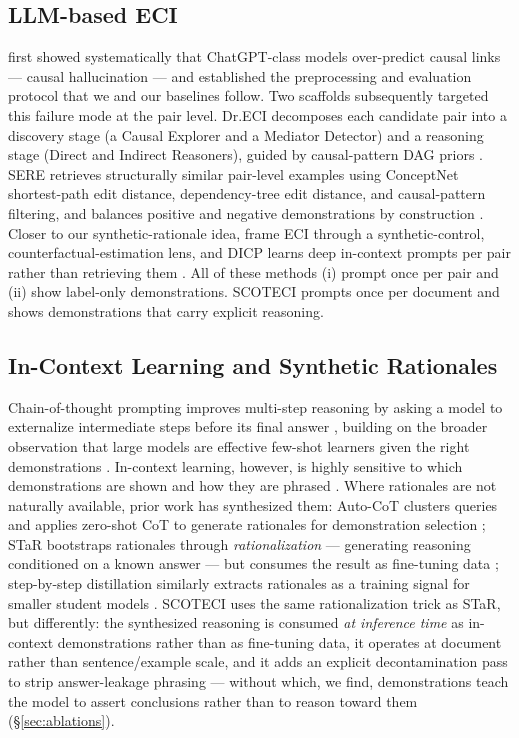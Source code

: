 \documentclass[11pt]{article}
\newcommand{\method}{SCOTECI}
\begin{document}
\subsection{LLM-based ECI}
\citet{gao2023chatgpt} first showed systematically that ChatGPT-class models
over-predict causal links --- causal hallucination --- and established the
preprocessing and evaluation protocol that we and our baselines follow. Two
scaffolds subsequently targeted this failure mode at the pair level. Dr.ECI
decomposes each candidate pair into a discovery stage (a Causal Explorer and a
Mediator Detector) and a reasoning stage (Direct and Indirect Reasoners), guided by
causal-pattern DAG priors \citep{cai2025dreci}. SERE retrieves structurally similar
pair-level examples using ConceptNet shortest-path edit distance, dependency-tree
edit distance, and causal-pattern filtering, and balances positive and negative
demonstrations by construction \citep{hao2026sere}. Closer to our synthetic-rationale
idea, \citet{wang2024synthetic} frame ECI through a synthetic-control,
counterfactual-estimation lens, and DICP learns deep in-context prompts per pair
rather than retrieving them \citep{mu2025dicp}. All of these methods (i) prompt once
per pair and (ii) show label-only demonstrations. \method{} prompts once per
document and shows demonstrations that carry explicit reasoning.

\subsection{In-Context Learning and Synthetic Rationales}
Chain-of-thought prompting improves multi-step reasoning by asking a model to
externalize intermediate steps before its final answer \citep{wei2022chain},
building on the broader observation that large models are effective few-shot
learners given the right demonstrations \citep{brown2020language}. In-context
learning, however, is highly sensitive to which demonstrations are shown and how
they are phrased \citep{liu2022makes, min2022rethinking}. Where rationales are not
naturally available, prior work has synthesized them: Auto-CoT clusters queries and
applies zero-shot CoT to generate rationales for demonstration selection
\citep{zhang2023autocot}; STaR bootstraps rationales through
\emph{rationalization} --- generating reasoning conditioned on a known answer ---
but consumes the result as fine-tuning data \citep{zelikman2022star}; step-by-step
distillation similarly extracts rationales as a training signal for smaller student
models \citep{hsieh2023distilling}. \method{} uses the same rationalization trick as
STaR, but differently: the synthesized reasoning is consumed \emph{at inference
time} as in-context demonstrations rather than as fine-tuning data, it operates at
document rather than sentence/example scale, and it adds an explicit decontamination
pass to strip answer-leakage phrasing --- without which, we find, demonstrations
teach the model to assert conclusions rather than to reason toward them
(\S\ref{sec:ablations}).
\end{document}
